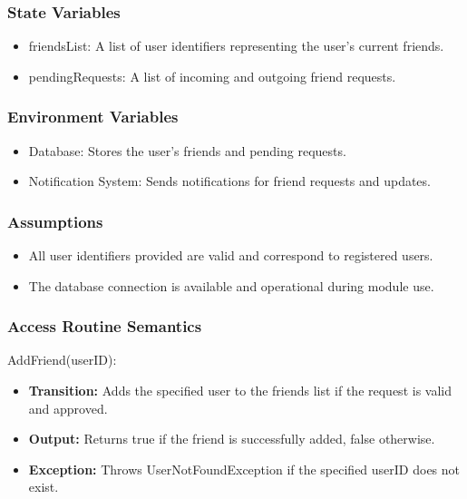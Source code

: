 \documentclass[12pt, titlepage]{article}
\begin{document}
\subsubsection{State Variables}

\begin{itemize}
    \item friendsList: A list of user identifiers representing the user's current friends.
    \item pendingRequests: A list of incoming and outgoing friend requests.
\end{itemize}

\subsubsection{Environment Variables}

\begin{itemize}
    \item Database: Stores the user’s friends and pending requests.
    \item Notification System: Sends notifications for friend requests and updates.
\end{itemize}

\subsubsection{Assumptions}

\begin{itemize}
    \item All user identifiers provided are valid and correspond to registered users.
    \item The database connection is available and operational during module use.
\end{itemize}

\subsubsection{Access Routine Semantics}

\noindent AddFriend(userID):
\begin{itemize}
    \item \textbf{Transition:} Adds the specified user to the friends list if the request is valid and approved.
    \item \textbf{Output:} Returns true if the friend is successfully added, false otherwise.
    \item \textbf{Exception:} Throws UserNotFoundException if the specified userID does not exist.
\end{itemize}
\end{document}
